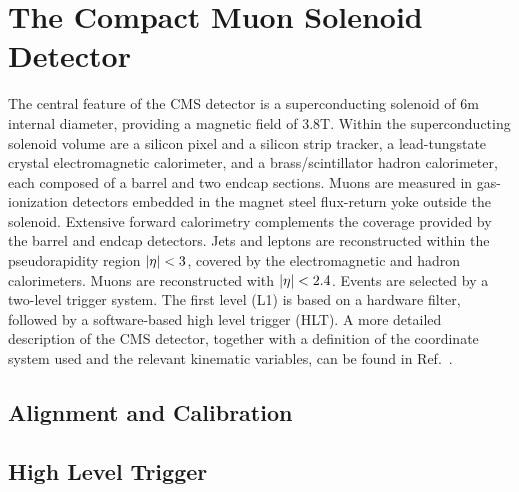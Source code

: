 \chapter{The Compact Muon Solenoid Detector}

The central feature of the CMS detector is a
superconducting solenoid of 6\unit{m} internal diameter, providing a
magnetic field of 3.8\unit{T}. Within the superconducting solenoid
volume are a silicon pixel and a silicon strip tracker, a
lead-tungstate crystal electromagnetic calorimeter, and a
brass/scintillator hadron calorimeter, each composed of a barrel and
two endcap sections. Muons are measured in gas-ionization detectors
embedded in the magnet steel flux-return yoke outside the
solenoid. Extensive forward calorimetry complements the coverage
provided by the barrel and endcap detectors. Jets and leptons are
reconstructed within the pseudorapidity region $\lvert \eta \rvert<3$, covered by the
electromagnetic and hadron calorimeters. Muons are reconstructed with
$\lvert \eta \rvert<2.4$. Events are selected by a
two-level trigger system. The first level (L1) is based on a hardware
filter, followed by a software-based high level trigger (HLT). A more
detailed description of the CMS detector, together with a definition
of the coordinate system used and the relevant kinematic variables,
can be found in Ref.~\cite{Adolphi:2008zzk}.

\section{Alignment and Calibration}
\section {High Level Trigger}
